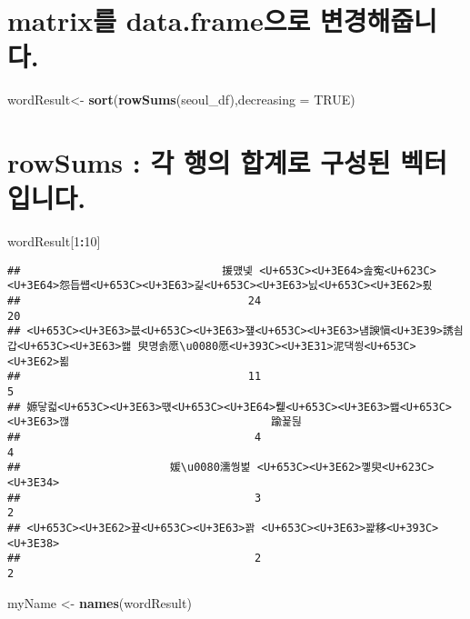 \documentclass[]{article}
\newenvironment{Shaded}{\begin{snugshade}}{\end{snugshade}}
\newcommand{\KeywordTok}[1]{\textcolor[rgb]{0.13,0.29,0.53}{\textbf{#1}}}
\newcommand{\DataTypeTok}[1]{\textcolor[rgb]{0.13,0.29,0.53}{#1}}
\newcommand{\DecValTok}[1]{\textcolor[rgb]{0.00,0.00,0.81}{#1}}
\newcommand{\StringTok}[1]{\textcolor[rgb]{0.31,0.60,0.02}{#1}}
\newcommand{\OtherTok}[1]{\textcolor[rgb]{0.56,0.35,0.01}{#1}}
\newcommand{\OperatorTok}[1]{\textcolor[rgb]{0.81,0.36,0.00}{\textbf{#1}}}
\newcommand{\NormalTok}[1]{#1}
\begin{document}
\section{matrix를 data.frame으로
변경해줍니다.}\label{matrix-data.frame-.}

\begin{Shaded}
\begin{Highlighting}[]
\NormalTok{wordResult<-}\StringTok{ }\KeywordTok{sort}\NormalTok{(}\KeywordTok{rowSums}\NormalTok{(seoul_df),}\DataTypeTok{decreasing =} \OtherTok{TRUE}\NormalTok{)}
\end{Highlighting}
\end{Shaded}

\section{rowSums : 각 행의 합계로 구성된
벡터입니다.}\label{rowsums-----.}

\begin{Shaded}
\begin{Highlighting}[]
\NormalTok{wordResult[}\DecValTok{1}\OperatorTok{:}\DecValTok{10}\NormalTok{]}
\end{Highlighting}
\end{Shaded}

\begin{verbatim}
##                               援먰넻 <U+653C><U+3E64>솚寃<U+623C><U+3E64>怨듭썝<U+653C><U+3E63>긽<U+653C><U+3E63>닔<U+653C><U+3E62>룄 
##                                   24                                   20 
## <U+653C><U+3E63>븞<U+653C><U+3E63>쟾<U+653C><U+3E63>냼諛愼<U+3E39>誘쇰갑<U+653C><U+3E63>쐞 臾명솕愿\u0080愿<U+393C><U+3E31>泥댁쑁<U+653C><U+3E62>뵒 
##                                   11                                    5 
## 嫄닿컯<U+653C><U+3E63>떇<U+653C><U+3E64>뭹<U+653C><U+3E63>쐞<U+653C><U+3E63>깮                               踰꾩뒪 
##                                    4                                    4 
##                       媛\u0080濡쒕벑 <U+653C><U+3E62>꼫臾<U+623C><U+3E34> 
##                                    3                                    2 
## <U+653C><U+3E62>끂<U+653C><U+3E63>꽑 <U+653C><U+3E63>꽕移<U+393C><U+3E38> 
##                                    2                                    2
\end{verbatim}

\begin{Shaded}
\begin{Highlighting}[]
\NormalTok{myName <-}\StringTok{ }\KeywordTok{names}\NormalTok{(wordResult)}
\end{Highlighting}
\end{Shaded}
\end{document}
